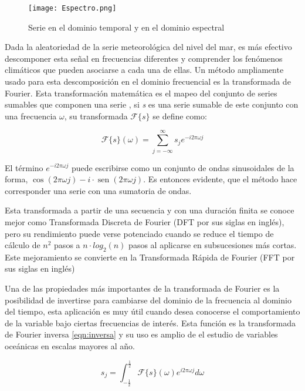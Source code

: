 \begin{figure}
	\centering
	\texttt{[image: Espectro.png]}
	\caption{Serie en el dominio temporal y en el dominio espectral}
	\label{fig:a_e}
\end{figure}

Dada la aleatoriedad de la serie meteorológica del nivel del mar, es más efectivo descomponer esta señal en frecuencias diferentes y comprender los fenómenos climáticos que pueden asociarse a cada una de ellas. Un método ampliamente usado para esta descomposición en el dominio frecuencial es la transformada de Fourier. Esta transformación matemática es el mapeo del conjunto de series sumables que componen una serie \citep{Lund2000}, si \textit{s} es una serie sumable de este conjunto con una frecuencia $\omega$, su transformada $\mathcal{F}\{s\}$ se define como:

\begin{equation}
\mathcal{F}\{s\}(\omega)=\sum_{j=-\infty}^{\infty} s_{j} e^{-i 2 \pi \omega j}
\label{eqn:normal}
\end{equation}

El término $e^{-i 2 \pi \omega j}$ puede escribirse como un conjunto de ondas sinusoidales de la forma, $\cos (2 \pi \omega j)-i \cdot \operatorname{sen}(2 \pi \omega j)$. Es entonces evidente, que el método hace corresponder una serie con una sumatoria de ondas. 

Esta transformada a partir de una secuencia y con una duración finita se conoce mejor como Transformada Discreta de Fourier (DFT por sus siglas en inglés), pero su rendimiento puede verse potenciado cuando se reduce el tiempo de cálculo de $n^{2}$ pasos a $n \cdot log_{2}(n)$ pasos
al aplicarse en subsucesiones más cortas. Este mejoramiento se convierte en la Transformada Rápida de Fourier (FFT por sus siglas en inglés) 

Una de las propiedades más importantes de la transformada de Fourier es la posibilidad de invertirse para cambiarse del dominio de la frecuencia al dominio del tiempo, esta aplicación es muy útil cuando desea conocerse el comportamiento de la variable bajo ciertas frecuencias de interés. Esta función es la transformada de Fourier inversa \ref{eqn:inversa} y su uso es amplio de el estudio de variables oceánicas en escalas mayores al año.

\begin{equation}
s_{j}=\int_{-\frac{1}{2}}^{\frac{1}{2}} \mathcal{F}\{s\}(\omega) e^{i 2 \pi \omega j} d \omega
\label{eqn:inversa}
\end{equation}

